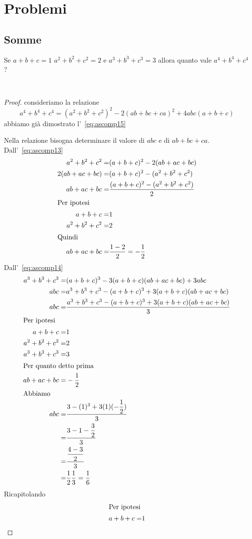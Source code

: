 \chapter{Problemi}
\section{Somme}
\begin{prob}
Se $a+b+c=1$ $a^2+b^2+c^2=2$ e $a^3+b^3+c^3=3$ allora quanto vale $a^4+b^4+c^4$?
\end{prob}~\cite{Gregorio2021}
\begin{proof}
consideriamo la relazione \[a^4+b^4+c^4=(a^2+b^2+c^2)^2-2(ab+bc+ca)^2+4abc(a+b+c)\] abbiamo già dimostrato l'~\vref{eq:ascomp15}

Nella relazione bisogna determinare il valore di $abc$ e di $ab+bc+ca$.
Dall'~\vref{eq:ascomp13}
\begin{align*}
a^2+b^2+c^2=&(a+b+c)^2-2(ab+ac+bc)\\
2(ab+ac+bc)=&(a+b+c)^2-(a^2+b^2+c^2)\\
ab+ac+bc=&\dfrac{(a+b+c)^2-(a^2+b^2+c^2)}{2}\\
\intertext{Per ipotesi}
a+b+c=&1\\
a^2+b^2+c^2=&2\\
\intertext{Quindi}
ab+ac+bc=&\dfrac{1-2}{2}=-\dfrac{1}{2}\\
\end{align*}
Dall'~\vref{eq:ascomp14}
\begin{align*}
	a^3+b^3+c^3=&{}(a+b+c)^3-3(a+b+c)(ab+ac+bc)+3abc\\
	abc=&a^3+b^3+c^3-(a+b+c)^3+3(a+b+c)(ab+ac+bc)\\
	abc=&	\dfrac{a^3+b^3+c^3-(a+b+c)^3+3(a+b+c)(ab+ac+bc)}{3}\\
	\intertext{Per ipotesi}
	a+b+c=&1\\
	a^2+b^2+c^2=&2\\
	a^3+b^3+c^3=&3\\
	\intertext{Per quanto detto prima}
	ab+ac+bc=&-\dfrac{1}{2}\\
	\intertext{Abbiamo}
	abc=&	\dfrac{3-(1)^3+3(1)(-\dfrac{1}{2})}{3}\\
	=&\dfrac{3-1-\dfrac{3}{2}}{3}\\
	=&\dfrac{\dfrac{4-3}{2}}{3}\\
	=&\dfrac{1}{2}\dfrac{1}{3}=\dfrac{1}{6}
\end{align*}
Ricapitolando
\begin{align*}
		\intertext{Per ipotesi}
	a+b+c=&1\\

\end{align*}
\end{proof}
